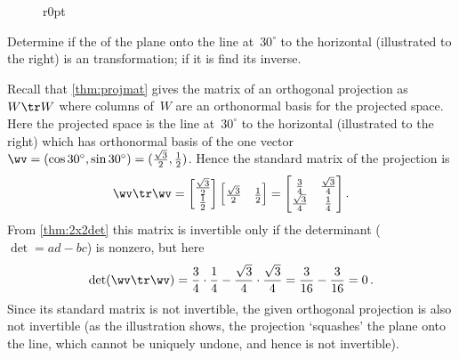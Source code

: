 \begin{wrapfigure}[5]r{0pt}
\end{wrapfigure}
\begin{example} 
Determine if the  of the plane onto the line at~\(30^\circ\) to the horizontal (illustrated to the right) is an  transformation; if it is find its inverse.

\begin{solution} 
Recall that \cref{thm:projmat} gives the matrix of an orthogonal projection as~\(W\tr W\) where columns of~\(W\) are an orthonormal basis for the projected space.
Here the projected space is the line at~\(30^\circ\) to the horizontal (illustrated to the right) which has orthonormal basis of the one vector \(\wv=(\cos 30^\circ,\sin 30^\circ)=(\tfrac{\sqrt3}2,\tfrac12)\).
Hence the standard matrix of the projection is
\begin{equation*}
\wv\tr\wv=\begin{bmatrix} \tfrac{\sqrt3}2\\\tfrac12 \end{bmatrix}
\begin{bmatrix} \tfrac{\sqrt3}2&\tfrac12 \end{bmatrix}
=\begin{bmatrix} \tfrac34&\tfrac{\sqrt3}4\\
\tfrac{\sqrt3}4&\tfrac14 \end{bmatrix}.
\end{equation*}
From \cref{thm:2x2det} this matrix is invertible only if the determinant (\(\det=ad-bc\)) is nonzero, but here
\begin{equation*}
\det(\wv\tr\wv)=\frac34\cdot\frac14-\frac{\sqrt3}4\cdot\frac{\sqrt3}4
=\frac3{16}-\frac3{16}=0\,.
\end{equation*}
Since its standard matrix is not invertible, the given orthogonal projection is also not invertible (as the illustration shows, the projection `squashes' the plane onto the line, which cannot be uniquely undone, and hence is not invertible).
\end{solution}
\end{example}







%



